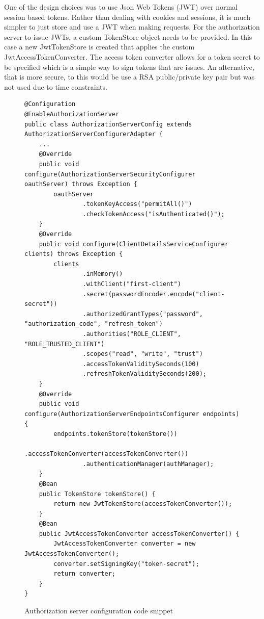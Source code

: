 One of the design choices was to use Json Web Tokens (JWT) over normal session based tokens.
Rather than dealing with cookies and sessions, it is much simpler to just store and use a JWT when making requests.
For the authorization server to issue JWTs, a custom TokenStore object needs to be provided.
In this case a new JwtTokenStore is created that applies the custom JwtAccessTokenConverter.
The access token converter allows for a token secret to be specified which is a simple way to sign tokens that are issues.
An alternative, that is more secure, to this would be use a RSA public/private key pair but was not used due to time constraints.

\begin{figure}[ht]
    \centering
    \begin{lstlisting}
@Configuration
@EnableAuthorizationServer
public class AuthorizationServerConfig extends AuthorizationServerConfigurerAdapter {
    ...
    @Override
    public void configure(AuthorizationServerSecurityConfigurer oauthServer) throws Exception {
        oauthServer
                .tokenKeyAccess("permitAll()")
                .checkTokenAccess("isAuthenticated()");
    }
    @Override
    public void configure(ClientDetailsServiceConfigurer clients) throws Exception {
        clients
                .inMemory()
                .withClient("first-client")
                .secret(passwordEncoder.encode("client-secret"))
                .authorizedGrantTypes("password", "authorization_code", "refresh_token")
                .authorities("ROLE_CLIENT", "ROLE_TRUSTED_CLIENT")
                .scopes("read", "write", "trust")
                .accessTokenValiditySeconds(100)
                .refreshTokenValiditySeconds(200);
    }
    @Override
    public void configure(AuthorizationServerEndpointsConfigurer endpoints) {
        endpoints.tokenStore(tokenStore())
                .accessTokenConverter(accessTokenConverter())
                .authenticationManager(authManager);
    }
    @Bean
    public TokenStore tokenStore() {
        return new JwtTokenStore(accessTokenConverter());
    }
    @Bean
    public JwtAccessTokenConverter accessTokenConverter() {
        JwtAccessTokenConverter converter = new JwtAccessTokenConverter();
        converter.setSigningKey("token-secret");
        return converter;
    }
}
    \end{lstlisting}
    \caption{Authorization server configuration code snippet}
    \label{authorizationconfigsnippet}
\end{figure}


